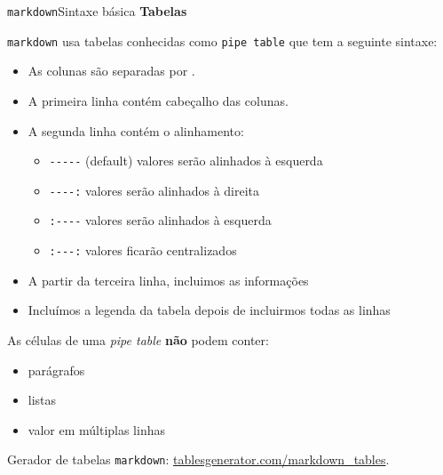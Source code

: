 \documentclass[
  10pt,
  ignorenonframetext,
]{beamer}
\providecommand{\tightlist}{%
  \setlength{\itemsep}{0pt}\setlength{\parskip}{0pt}}\usepackage{longtable,booktabs,array}
\newcommand*{\destaque}[1]{%
    \colorbox{cabecalho}{\textcolor{titulo}{#1}}
}
\begin{document}
\begin{frame}[fragile]{\texttt{markdown}\newline Sintaxe básica}
\protect\hypertarget{markdownsintaxe-buxe1sica-12}{}
\textbf{Tabelas}

\texttt{markdown} usa tabelas conhecidas como \texttt{pipe\ table} que
tem a seguinte sintaxe:

\begin{itemize}
\tightlist
\item
  As colunas são separadas por \texttt{\textbar{}}.
\item
  A primeira linha contém cabeçalho das colunas.
\item
  A segunda linha contém o alinhamento:

  \begin{itemize}
  \tightlist
  \item
    \texttt{-\/-\/-\/-\/-} (default) valores serão alinhados à esquerda
  \item
    \texttt{-\/-\/-\/-:} valores serão alinhados à direita
  \item
    \texttt{:-\/-\/-\/-} valores serão alinhados à esquerda
  \item
    \texttt{:-\/-\/-:} valores ficarão centralizados
  \end{itemize}
\item
  A partir da terceira linha, incluimos as informações
\item
  Incluímos a legenda da tabela depois de incluirmos todas as linhas
\end{itemize}
\end{frame}

\begin{frame}[fragile]
\destaque{As células de uma \textit{pipe table} \textbf{não} podem conter:} 
\begin{itemize}
    \item \destaque{parágrafos}
    \item \destaque{listas}
    \item \destaque{valor em múltiplas linhas}
\end{itemize}

Gerador de tabelas \texttt{markdown}:
\href{https://www.tablesgenerator.com/markdown_tables}{tablesgenerator.com/markdown\_tables}.
\end{frame}
\end{document}
